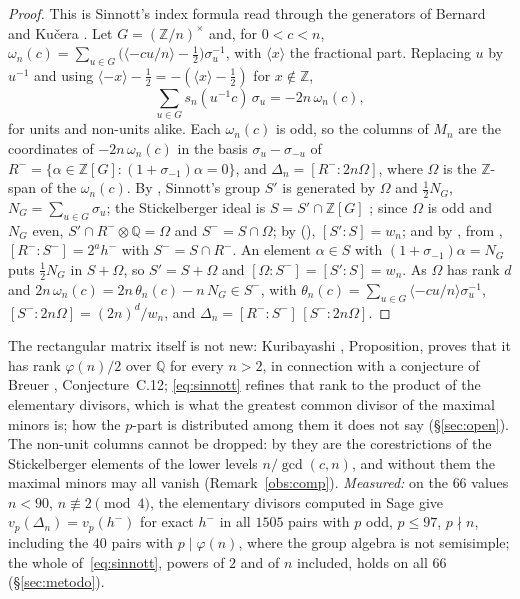 \documentclass[11pt,a4paper]{article}
\theoremstyle{definition}
\newcommand{\ZZ}{\mathbb{Z}}
\newcommand{\QQ}{\mathbb{Q}}
\begin{document}
\begin{proof}
This is Sinnott's index formula \cite{Sin78,Sin80} read through the generators of Bernard and Kučera \cite{BK24}.
Let $G=(\ZZ/n)^\times$ and, for $0<c<n$, $\omega_n(c)=\sum_{u\in G}\bigl(\langle-cu/n\rangle-\tfrac12\bigr)\sigma_u^{-1}$, with
$\langle x\rangle$ the fractional part. Replacing $u$ by $u^{-1}$ and using $\langle-x\rangle-\tfrac12=-(\langle
x\rangle-\tfrac12)$ for $x\notin\ZZ$,
\[
\sum_{u\in G}s_n(u^{-1}c)\,\sigma_u=-2n\,\omega_n(c),
\]
for units and non-units alike. Each $\omega_n(c)$ is odd, so the columns of $M_n$ are the coordinates of $-2n\,\omega_n(c)$
in the basis $\sigma_u-\sigma_{-u}$ of $R^-=\{\alpha\in\ZZ[G]:(1+\sigma_{-1})\alpha=0\}$, and $\Delta_n=[R^-:2n\Omega]$,
where $\Omega$ is the $\ZZ$-span of the $\omega_n(c)$. By \cite[Lemma~1.2 and (7)]{BK24}, Sinnott's group $S'$ is
generated by $\Omega$ and $\tfrac12N_G$, $N_G=\sum_{u\in G}\sigma_u$; the Stickelberger ideal is $S=S'\cap\ZZ[G]$ \cite[\S1]{BK24}; since $\Omega$ is
odd and $N_G$ even, $S'\cap R^-\otimes\QQ=\Omega$ and $S^-=S\cap\Omega$; by \cite[Lemma~1.1]{BK24}
(\cite[Proposition~2.1]{Sin80}), $[S':S]=w_n$; and by \cite[(26)]{BK24}, from \cite{Sin78}, $[R^-:S^-]=2^ah^-$ with
$S^-=S\cap R^-$. An element $\alpha\in S$ with $(1+\sigma_{-1})\alpha=N_G$ \cite[Proposition~3.1]{BK24} puts
$\tfrac12N_G$ in $S+\Omega$, so $S'=S+\Omega$ and $[\Omega:S^-]=[S':S]=w_n$. As $\Omega$ has rank $d$ and
$2n\,\omega_n(c)=2n\,\theta_n(c)-n\,N_G\in S^-$, with $\theta_n(c)=\sum_{u\in G}\langle-cu/n\rangle\sigma_u^{-1}$,
$[S^-:2n\Omega]=(2n)^d/w_n$, and $\Delta_n=[R^-:S^-]\,[S^-:2n\Omega]$.
\end{proof}

\noindent The rectangular matrix itself is not new: Kuribayashi \cite{Kur08}, Proposition, proves that it has rank
$\varphi(n)/2$ over $\QQ$ for every $n>2$, in connection with a conjecture of Breuer \cite{Bre00}, Conjecture~C.12;
\eqref{eq:sinnott} refines that rank to the product of the elementary divisors, which is what the greatest common
divisor of the maximal minors is; how the $p$-part is distributed among them it does not say (\S\ref{sec:open}). The non-unit columns cannot be dropped: by
\cite[(6)]{BK24} they are the corestrictions of the
Stickelberger elements of the lower levels $n/\gcd(c,n)$, and without them the maximal minors may all vanish
(Remark~\ref{obs:comp}). \emph{Measured:} on the $66$ values $n<90$, $n\not\equiv2\pmod4$, the elementary divisors computed in Sage give
$v_p(\Delta_n)=v_p(h^-)$ for exact $h^-$ in all $1505$ pairs with $p$ odd, $p\le97$, $p\nmid n$, including the $40$
pairs with $p\mid\varphi(n)$, where the group algebra is not semisimple; the whole of~\eqref{eq:sinnott}, powers of $2$
and of $n$ included, holds on all $66$ (\S\ref{sec:metodo}).
\end{document}
